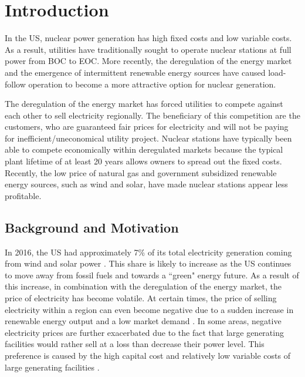 \documentclass[edeposit,fullpage,11pt]{uiucthesis2009}
\begin{document}

\mainmatter

\chapter{Introduction}

In the \gls{US}, nuclear power generation has high fixed costs and low variable costs. 
As a result, utilities have traditionally sought to operate nuclear stations at full power from \gls{BOC} to \gls{EOC}. 
More recently, the deregulation of the energy market and the emergence of intermittent renewable energy sources have caused load-follow operation to become a more attractive option for nuclear generation. 

The deregulation of the energy market has forced utilities to compete against each other to sell electricity regionally.
The beneficiary of this competition are the customers, who are guaranteed fair prices for electricity and will not be paying for inefficient/uneconomical utility project. %
Nuclear stations have typically been able to compete economically  within deregulated markets because the typical plant lifetime of at least 20 years allows owners to spread out the fixed costs.
Recently, the low price of natural gas and government subsidized renewable energy sources, such as wind and solar, have made nuclear stations appear less profitable.   

\section{Background and Motivation}

In 2016, the \gls{US} had approximately 7\% of its total electricity generation coming from wind and solar power \cite{u.s_energy_information_administration_electricity_2016}. 
This share is likely to increase as the \gls{US} continues to move away from fossil fuels and towards a ``green" energy future.
As a result of this increase, in combination with the deregulation of the energy market, the price of electricity has become volatile. 
At certain times, the price of selling electricity within a region can even become negative due to a sudden increase in renewable energy output and a low market demand \cite{paraschiv_impact_2014}. 
In some areas, negative electricity prices are further exacerbated due to the fact that large generating facilities would rather sell at a loss than decrease their power level. 
This preference is caused by the high capital cost and relatively low variable costs of large generating facilities \cite{lokhov_load-following_2011}.
\end{document}
